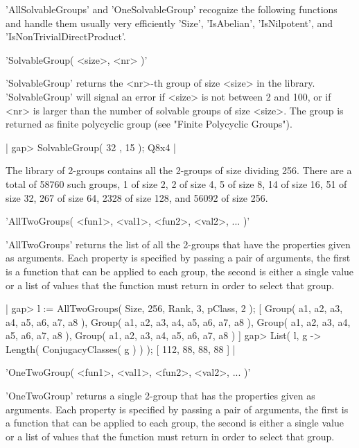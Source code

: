 'AllSolvableGroups' and  'OneSolvableGroup'   recognize   the   following
functions and handle them usually very efficiently\: 'Size', 'IsAbelian',
'IsNilpotent', and 'IsNonTrivialDirectProduct'.

\vspace{5mm}
'SolvableGroup( <size>, <nr> )'%

'SolvableGroup' returns the <nr>-th group of size  <size> in the library.
'SolvableGroup'  will signal an error if <size> is not between 2 and 100,
or if <nr> is larger  than the number of solvable groups of  size <size>.
The group is returned as finite polycyclic  group (see "Finite Polycyclic
Groups").

|    gap> SolvableGroup( 32 , 15 );
    Q8x4 |

\newpage
{}%

The  library  of 2-groups contains all the 2-groups of size dividing 256.
There  are a total of 58760 such groups, 1  of size 2,  2 of size 4, 5 of
size  8, 14 of size 16, 51  of size 32, 267 of size 64, 2328 of size 128,
and 56092 of size 256.

\vspace{5mm}
'AllTwoGroups( <fun1>, <val1>, <fun2>, <val2>, ... )'%

'AllTwoGroups'  returns the  list  of  all  the  2-groups that  have  the
properties given as arguments.   Each property  is specified by passing a
pair of arguments,  the first  is  a function that can be applied to each
group, the second is either a  single value or  a list of values that the
function must return in order to select that group.

|    gap> l := AllTwoGroups( Size, 256, Rank, 3, pClass, 2 );
    [ Group( a1, a2, a3, a4, a5, a6, a7, a8 ),
      Group( a1, a2, a3, a4, a5, a6, a7, a8 ),
      Group( a1, a2, a3, a4, a5, a6, a7, a8 ),
      Group( a1, a2, a3, a4, a5, a6, a7, a8 ) ]
    gap> List( l, g -> Length( ConjugacyClasses( g ) ) );
    [ 112, 88, 88, 88 ] |

\vspace{5mm}
'OneTwoGroup( <fun1>, <val1>, <fun2>, <val2>, ... )'%

'OneTwoGroup' returns a single 2-group that  has the  properties given as
arguments.   Each property is  specified by passing a pair of  arguments,
the first is a function that can  be applied to each group, the second is
either a single value or a list  of values that the function  must return
in order to select that group.


